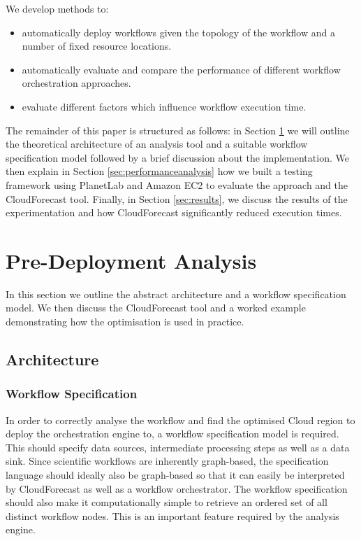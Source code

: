 \documentclass[10pt, conference, compsocconf]{IEEEtran}
\newcommand{\sysname}{CloudForecast\xspace}
\begin{document}
We develop methods to:
\begin{itemize}
  \item automatically deploy workflows given the topology of the workflow and a number of fixed resource locations.
  \item automatically evaluate and compare the performance of different workflow orchestration approaches.
  \item evaluate different factors which influence workflow execution time.
\end{itemize}

The remainder of this paper is structured as follows: in Section \ref{sec:preanalysis} we will outline the theoretical architecture of an analysis tool and a suitable workflow specification model followed by a brief discussion about the implementation. We then explain in Section \ref{sec:performanceanalysis} how we built a testing framework using PlanetLab and Amazon EC2 to evaluate the approach and the \sysname tool. Finally, in Section \ref{sec:results}, we discuss the results of the experimentation and how \sysname significantly reduced execution times.

\section{Pre-Deployment Analysis}
\label{sec:preanalysis}
In this section we outline the abstract architecture and a workflow specification model. We then discuss the \sysname tool and a worked example demonstrating how the optimisation is used in practice.



\subsection{Architecture}

\subsubsection{Workflow Specification}
In order to correctly analyse the workflow and find the optimised Cloud region to deploy the orchestration engine to, a workflow specification model is required. This should specify data sources, intermediate processing steps as well as a data sink. Since scientific workflows are inherently graph-based, the specification language should ideally also be graph-based so that it can easily be interpreted by \sysname as well as a workflow orchestrator. The workflow specification should also make it computationally simple to retrieve an ordered set of all distinct workflow nodes. This is an important feature required by the analysis engine.
\end{document}
